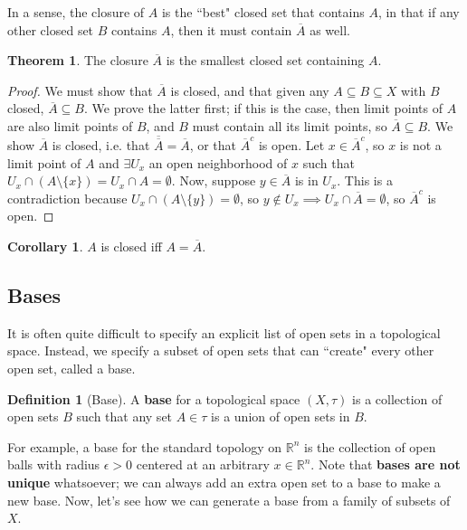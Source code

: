 \documentclass[11pt, oneside]{amsart}   	%
\theoremstyle{definition}
\newtheorem{definition}{Definition}[section]
\newtheorem{theorem}{Theorem}[section]
\newtheorem{corollary}{Corollary}[theorem]
\begin{document}
	In a sense, the closure of $A$ is the ``best" closed set that contains $A$, in that if any other closed set $B$ contains $A$, then it must contain $\overline A$ 
	as well.
	
	\begin{theorem}
		The closure $\overline A$ is the smallest closed set containing $A$.
	\end{theorem}
	
	\begin{proof}
		We must show that $\overline A$ is closed, and that given any $A\subseteq B\subseteq X$ with $B$ closed, $\overline A\subseteq B$. We prove the 
		latter first; if this is the case, then limit points of $A$ are also limit points of $B$, and $B$ must contain all its limit points, so $\overline A\subseteq B$. 
		We show $\overline A$ is closed, i.e. that $\overline{\overline A} = \overline A$, or that $\overline A^c$ is open. Let $x\in \overline A^c$, so $x$ is 
		not a limit point of $A$ and $\exists U_x$ an open neighborhood of $x$ such that $U_x\cap (A\setminus \{x\}) = U_x\cap A = \emptyset$. Now, 
		suppose $y\in\overline A$ is in $U_x$. This is a contradiction because $U_x\cap(A\setminus\{y\}) = \emptyset$, so $y\notin U_x\implies U_x\cap
		\overline A = \emptyset$, so $\overline A^c$ is open. 
	\end{proof}
	
	\begin{corollary}
		$A$ is closed iff $A = \overline A$. 
	\end{corollary}
	
	\subsection{Bases}
	
	It is often quite difficult to specify an explicit list of open sets in a topological space. Instead, we specify a subset of open sets that can ``create" every other open 
	set, called a base.
	
	\begin{definition}[Base]
		A \textbf{base} for a topological space $(X, \tau)$ is a collection of open sets $B$ such that any set $A\in\tau$ is a union of open sets in $B$.
	\end{definition}
	
	For example, a base for the standard topology on $\mathbb R^n$ is the collection of open balls with radius $\epsilon > 0$ centered at an arbitrary $x\in
	\mathbb R^n$. Note that \textbf{bases are not unique} whatsoever; we can always add an extra open set to a base to make a new base. Now, let's see 
	how we can generate a base from a family of subsets of $X$. 
	
\end{document}
